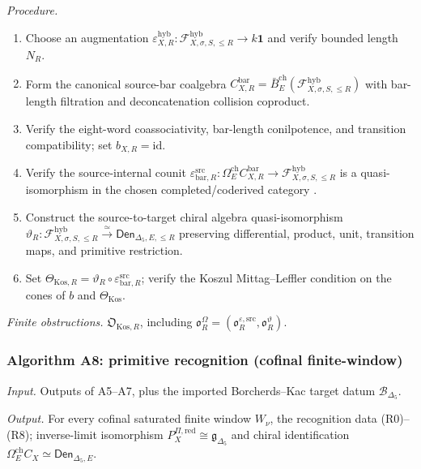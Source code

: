 \textit{Procedure.}
\begin{enumerate}
\item Choose an augmentation
$\varepsilon_{X,R}^{\mathrm{hyb}}:\mathcal F_{X,\sigma,S,\le R}^{\mathrm{hyb}}
\to k\mathbf 1$ and verify bounded length $N_R$.
\item Form the canonical source-bar coalgebra
$C^{\mathrm{bar}}_{X,R}=\bar B_E^{\mathrm{ch}}(\mathcal F_{X,\sigma,S,\le R}^{\mathrm{hyb}})$
\cite[\S3.7]{BD} with bar-length filtration and deconcatenation
collision coproduct.
\item Verify the eight-word coassociativity, bar-length conilpotence,
and transition compatibility; set $b_{X,R}=\mathrm{id}$.
\item Verify the source-internal counit
$\varepsilon^{\mathrm{src}}_{\mathrm{bar},R}:\Omega_E^{\mathrm{ch}}
C^{\mathrm{bar}}_{X,R}\to\mathcal F_{X,\sigma,S,\le R}^{\mathrm{hyb}}$
is a quasi-isomorphism in the chosen completed/coderived category
\cite[Theorem~6.2.2]{FrancisGaitsgoryCKD}.
\item Construct the source-to-target chiral algebra
quasi-isomorphism $\vartheta_R:
\mathcal F_{X,\sigma,S,\le R}^{\mathrm{hyb}}\xrightarrow{\simeq}
\mathsf{Den}_{\Delta_5,E,\le R}$ preserving differential, product,
unit, transition maps, and primitive restriction.
\item Set $\Theta_{\mathrm{Kos},R}=
\vartheta_R\circ\varepsilon^{\mathrm{src}}_{\mathrm{bar},R}$;
verify the Koszul Mittag--Leffler condition on the cones of $b$ and
$\Theta_{\mathrm{Kos}}$.
\end{enumerate}

\textit{Finite obstructions.}  $\mathfrak O_{\mathrm{Kos},R}$,
including $\mathfrak o^\Omega_R=
(\mathfrak o^{\varepsilon,\mathrm{src}}_R,
\mathfrak o^\vartheta_R)$.

\subsubsection*{Algorithm A8: primitive recognition (cofinal
finite-window)}

\textit{Input.} Outputs of A5--A7, plus the imported Borcherds--Kac
target datum $\mathscr B_{\Delta_5}$.

\textit{Output.} For every cofinal saturated finite window $W_\nu$,
the recognition data (R0)--(R8); inverse-limit isomorphism
$P_X^{\Pi,\mathrm{red}}\cong\mathfrak g_{\Delta_5}$ and chiral
identification $\Omega_E^{\mathrm{ch}}C_X\simeq\mathsf{Den}_{\Delta_5,E}$.

